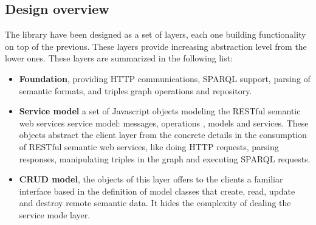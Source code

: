 \subsection{Design overview}

The library have been designed as a set of layers, each one building functionality on top of the previous. These layers
provide increasing abstraction level from the lower ones. These layers are summarized in the following list:

\begin{itemize}
\item \textbf{Foundation}, providing HTTP communications, SPARQL support, parsing of semantic formats, and triples
  graph operations and repository.
\item \textbf{Service model} a set of Javascript objects modeling the RESTful semantic web services service model:
  messages, operations , models and services. These objects abstract the client layer from the concrete details in the consumption of
  RESTful semantic web services, like doing HTTP requests, parsing responses, manipulating triples in the graph and
  executing SPARQL requests.
\item \textbf{CRUD model}, the objects of this layer offers to the clients a familiar interface based in the definition
  of model classes that create, read, update and destroy remote semantic data. It hides the complexity of dealing the
  service mode layer.
\end{itemize}

